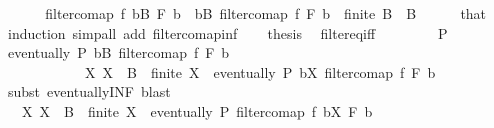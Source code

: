 \begin{isabellebody}
%
\isadelimproof
%
\endisadelimproof
%
\isatagproof
{}\isamarkupfalse%
\ {\isacharminus}{\kern0pt}\isanewline
\ \ \isamarkupfalse%
\ {\isacharasterisk}{\kern0pt}{\isacharcolon}{\kern0pt}\ {\isachardoublequoteopen}filtercomap\ f\ {\isacharparenleft}{\kern0pt}{\isasymSqinter}b{\isasymin}B{\isachardot}{\kern0pt}\ F\ b{\isacharparenright}{\kern0pt}\ {\isacharequal}{\kern0pt}\ {\isacharparenleft}{\kern0pt}{\isasymSqinter}b{\isasymin}B{\isachardot}{\kern0pt}\ filtercomap\ f\ {\isacharparenleft}{\kern0pt}F\ b{\isacharparenright}{\kern0pt}{\isacharparenright}{\kern0pt}{\isachardoublequoteclose}\ \ {\isachardoublequoteopen}finite\ B{\isachardoublequoteclose}\ \ B\isanewline
\ \ \ \ \isamarkupfalse%
\ that\ \isamarkupfalse%
\ induction\ {\isacharparenleft}{\kern0pt}simp{\isacharunderscore}{\kern0pt}all\ add{\isacharcolon}{\kern0pt}\ filtercomap{\isacharunderscore}{\kern0pt}inf{\isacharparenright}{\kern0pt}\isanewline
\ \ \isamarkupfalse%
\ {\isacharquery}{\kern0pt}thesis\ \isamarkupfalse%
\ filter{\isacharunderscore}{\kern0pt}eq{\isacharunderscore}{\kern0pt}iff\isanewline
\ \ \isamarkupfalse%
\isanewline
\ \ \ \ \isamarkupfalse%
\ P\isanewline
\ \ \ \ \isamarkupfalse%
\ {\isachardoublequoteopen}eventually\ P\ {\isacharparenleft}{\kern0pt}{\isasymSqinter}b{\isasymin}B{\isachardot}{\kern0pt}\ filtercomap\ f\ {\isacharparenleft}{\kern0pt}F\ b{\isacharparenright}{\kern0pt}{\isacharparenright}{\kern0pt}\ {\isasymlongleftrightarrow}\ \isanewline
\ \ \ \ \ \ \ \ \ \ \ \ {\isacharparenleft}{\kern0pt}{\isasymexists}X{\isachardot}{\kern0pt}\ {\isacharparenleft}{\kern0pt}X\ {\isasymsubseteq}\ B\ {\isasymand}\ finite\ X{\isacharparenright}{\kern0pt}\ {\isasymand}\ eventually\ P\ {\isacharparenleft}{\kern0pt}{\isasymSqinter}b{\isasymin}X{\isachardot}{\kern0pt}\ filtercomap\ f\ {\isacharparenleft}{\kern0pt}F\ b{\isacharparenright}{\kern0pt}{\isacharparenright}{\kern0pt}{\isacharparenright}{\kern0pt}{\isachardoublequoteclose}\isanewline
\ \ \ \ \ \ \isamarkupfalse%
\ {\isacharparenleft}{\kern0pt}subst\ eventually{\isacharunderscore}{\kern0pt}INF{\isacharparenright}{\kern0pt}\ blast\isanewline
\ \ \ \ \isamarkupfalse%
\ \isamarkupfalse%
\ {\isachardoublequoteopen}{\isasymdots}\ {\isasymlongleftrightarrow}\ {\isacharparenleft}{\kern0pt}{\isasymexists}X{\isachardot}{\kern0pt}\ {\isacharparenleft}{\kern0pt}X\ {\isasymsubseteq}\ B\ {\isasymand}\ finite\ X{\isacharparenright}{\kern0pt}\ {\isasymand}\ eventually\ P\ {\isacharparenleft}{\kern0pt}filtercomap\ f\ {\isacharparenleft}{\kern0pt}{\isasymSqinter}b{\isasymin}X{\isachardot}{\kern0pt}\ F\ b{\isacharparenright}{\kern0pt}{\isacharparenright}{\kern0pt}{\isacharparenright}{\kern0pt}{\isachardoublequoteclose}\isanewline

\end{isabellebody}
